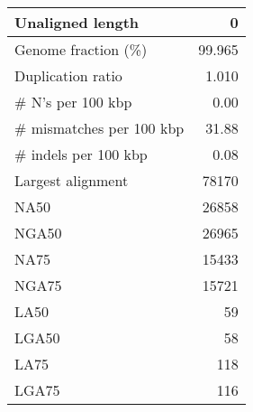\documentclass[12pt,a4paper]{article}
\begin{document}
\begin{table}[ht]
\begin{center}
\begin{tabular}{|l*{1}{|r}|}
Unaligned length & 0 \\ \hline
Genome fraction (\%) & 99.965 \\ \hline
Duplication ratio & 1.010 \\ \hline
\# N's per 100 kbp & 0.00 \\ \hline
\# mismatches per 100 kbp & 31.88 \\ \hline
\# indels per 100 kbp & 0.08 \\ \hline
Largest alignment & 78170 \\ \hline
NA50 & 26858 \\ \hline
NGA50 & 26965 \\ \hline
NA75 & 15433 \\ \hline
NGA75 & 15721 \\ \hline
LA50 & 59 \\ \hline
LGA50 & 58 \\ \hline
LA75 & 118 \\ \hline
LGA75 & 116 \\ \hline
\end{tabular}
\end{center}
\end{table}
\end{document}

